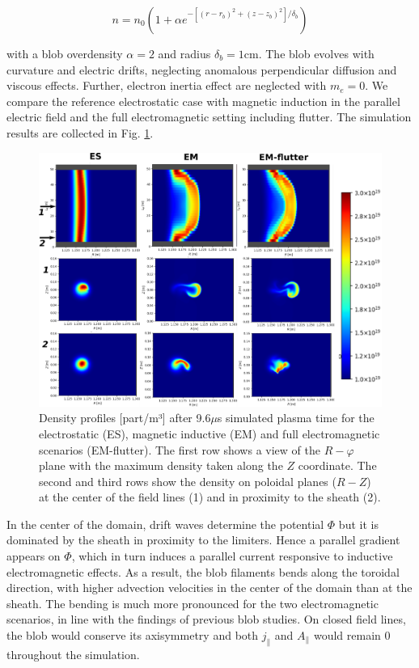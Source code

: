 \begin{equation}
	n = n_0 \left(1 + \alpha e^{-\left[(r-r_b)^2+(z-z_b)^2\right]/\delta_b}\right)
	\label{eq:blobInitProfile}
\end{equation}

with a blob overdensity $\alpha = 2$ and radius $\delta_b = 1$cm. The blob evolves with curvature and electric drifts, neglecting anomalous perpendicular diffusion and viscous effects. Further, electron inertia effect are neglected with $m_e = 0$. We compare the reference electrostatic case with magnetic induction in the parallel electric field and the full electromagnetic setting including flutter. The simulation results are collected in Fig. \ref{fig:BLOB}. \newline

\begin{figure}[H]\centering
	\centering
	\includegraphics[width=1.\textwidth]{schemes/blob_compare_9_6_microsec.png}
	\caption{Density profiles [part/m³] after 9.6$\mu$s simulated plasma time for the electrostatic (ES), magnetic inductive (EM) and full electromagnetic scenarios (EM-flutter). The first row shows a view of the $R-\varphi$ plane with the maximum density taken along the $Z$ coordinate. The second and third rows show the density on poloidal planes ($R-Z$) at the center of the field lines (1) and in proximity to the sheath (2).}
	\label{fig:BLOB}
\end{figure}

In the center of the domain, drift waves determine the potential $\Phi$ but it is dominated by the sheath in proximity to the limiters. Hence a parallel gradient appears on $\Phi$, which in turn induces a parallel current responsive to inductive electromagnetic effects. As a result, the blob filaments bends along the toroidal direction, with higher advection velocities in the center of the domain than at the sheath. The bending is much more pronounced for the two electromagnetic scenarios, in line with the findings of previous blob studies\cite{lee2015,lee2015electromagnetic,Stepanenko_2020}. On closed field lines, the blob would conserve its axisymmetry and both $j_\parallel$ and $A_\parallel$ would remain 0 throughout the simulation. \newline




